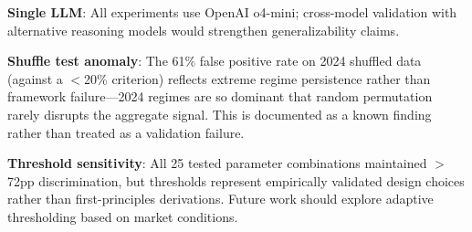 \noindent\textbf{Single LLM}: All experiments use OpenAI o4-mini; cross-model validation with alternative reasoning models would strengthen generalizability claims.

\noindent\textbf{Shuffle test anomaly}: The 61\% false positive rate on 2024 shuffled data (against a $<$20\% criterion) reflects extreme regime persistence rather than framework failure---2024 regimes are so dominant that random permutation rarely disrupts the aggregate signal. This is documented as a known finding rather than treated as a validation failure.

\noindent\textbf{Threshold sensitivity}: All 25 tested parameter combinations maintained $>$72pp discrimination, but thresholds represent empirically validated design choices rather than first-principles derivations. Future work should explore adaptive thresholding based on market conditions.
